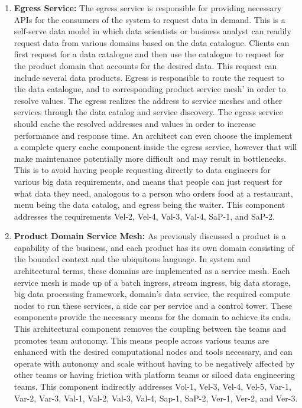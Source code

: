 \documentclass[review]{elsarticle}
\begin{document}
\begin{enumerate}
    \item \textbf{Egress Service:} The egress service is responsible for providing necessary APIs for the consumers of the system to request data in demand. This is a self-serve data model in which data scientists or business analyst can readily request data from various domains based on the data catalogue. Clients can first request for a data catalogue and then use the catalogue to request for the product domain that accounts for the desired data. This request can include several data products. Egress is responsible to route the request to the data catalogue, and to corresponding product service mesh' in order to resolve values. The egress realizes the address to service meshes and other services through the data catalog and service discovery. The egress service should cache the resolved addresses and values in order to increase performance and response time. An architect can even choose the implement a complete query cache component inside the egress service, however that will make maintenance potentially more difficult and may result in bottlenecks. This is to avoid having people requesting directly to data engineers for various big data requirements, and means that people can just request for what data they need, analogous to a person who orders food at a restaurant, menu being the data catalog, and egress being the waiter. This component addresses the requirements Vel-2, Vel-4, Val-3, Val-4, SaP-1, and SaP-2.
    \item \textbf{Product Domain Service Mesh:} As previously discussed a product is a capability of the business, and each product has its own domain consisting of the bounded context and the ubiquitous language. In system and architectural terms, these domains are implemented as a service mesh. Each service mesh is made up of a batch ingress, stream ingress, big data storage, big data processing framework, domain's data service, the required compute nodes to run these services, a side car per service and a control tower. These components provide the necessary means for the domain to achieve its ends. This architectural component removes the coupling between the teams and promotes team autonomy. This means people across various teams are enhanced with the desired computational nodes and tools necessary, and can operate with autonomy and scale without having to be negatively affected by other teams or having friction with platform teams or siloed data engineering teams. This component indirectly addresses Vol-1, Vel-3, Vel-4, Vel-5, Var-1, Var-2, Var-3, Val-1, Val-2, Val-3, Val-4, Sap-1, SaP-2, Ver-1, Ver-2, and Ver-3.

\end{enumerate}
\end{document}
